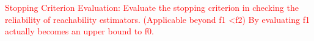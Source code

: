 \documentclass[conference]{IEEEtran}
\newcommand{\result}[1]{%
\begin{tcolorbox}[colframe=black,boxrule=0.5pt,arc=4pt,
      left=6pt,right=6pt,top=6pt,bottom=6pt,boxsep=0pt,width=\columnwidth]%
      {\emph{#1}}
\end{tcolorbox}%
}
\begin{document}
% 
% 
% 

\textcolor{red}{Stopping Criterion Evaluation:
Evaluate the stopping criterion in checking the reliability of reachability estimators. (Applicable beyond f1 <f2) By evaluating f1 actually becomes an upper bound to f0.
}
\end{document}
